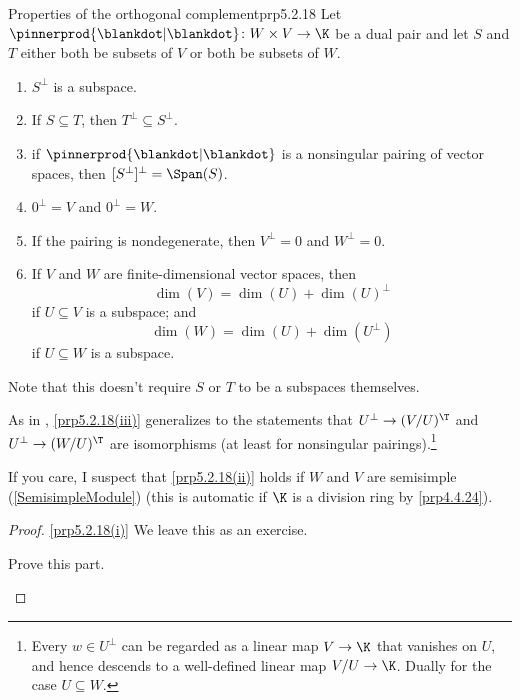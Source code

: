 \begin{prp}{Properties of the orthogonal complement}{prp5.2.18}
	Let $\pinnerprod{\blankdot |\blankdot}\colon W\times V\rightarrow \K$ be a dual pair and let $S$ and $T$ either both be subsets of $V$ or both be subsets of $W$.
	\begin{enumerate}
		\item \label{prp5.2.18(i)}$S^{\perp}$ is a subspace.
		\item \label{prp5.2.18(iix)}If $S\subseteq T$, then $T^{\perp}\subseteq S^{\perp}$.
		\item \label{prp5.2.18(ii)}if $\pinnerprod{\blankdot |\blankdot}$ is a nonsingular pairing of vector spaces, then $[S^{\perp}]^{\perp}=\Span (S)$.
		\item \label{prp5.2.18(iiix)}$0^{\perp}=V$ and $0^{\perp}=W$.
		\item \label{prp5.2.18(iiixx)}If the pairing is nondegenerate, then $V^{\perp}=0$ and $W^{\perp}=0$.
		\item \label{prp5.2.18(iii)}If $V$ and $W$ are finite-dimensional vector spaces, then
		\begin{equation}
			\dim (V)=\dim (U)+\dim (U)^{\perp}
		\end{equation}
		if $U\subseteq V$ is a subspace; and
		\begin{equation}
			\dim (W)=\dim (U)+\dim (U^{\perp})
		\end{equation}
		if $U\subseteq W$ is a subspace.
	\end{enumerate}
	\begin{rmk}
		Note that this doesn't require $S$ or $T$ to be a subspaces themselves.
	\end{rmk}
	\begin{rmk}
		As in , \cref{prp5.2.18(iii)} generalizes to the statements that $U^{\perp}\rightarrow (V/U)^{\T}$ and $U^{\perp}\rightarrow (W/U)^{\T}$ are isomorphisms (at least for nonsingular pairings).\footnote{Every $w\in U^{\perp}$ can be regarded as a linear map $V\rightarrow \K$ that vanishes on $U$, and hence descends to a well-defined linear map $V/U\rightarrow \K$.  Dually for the case $U\subseteq W$.}
	\end{rmk}
	\begin{rmk}
		If you care, I suspect that \cref{prp5.2.18(ii)} holds if $W$ and $V$ are semisimple (\cref{SemisimpleModule}) (this is automatic if $\K$ is a division ring by \cref{prp4.4.24}).
	\end{rmk}
	\begin{proof}
		\cref{prp5.2.18(i)} We leave this as an exercise.
		\begin{exr}[breakable=false]{}{}
			Prove this part.
		\end{exr}
		

\end{proof}
\end{prp}
